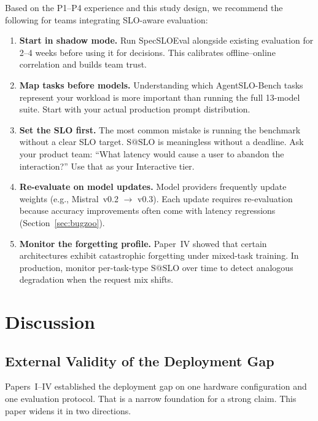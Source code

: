 \documentclass[11pt]{article}
\makeatletter
\newcommand{\sslo}{\ensuremath{\mathrm{S@SLO}}}
\makeatother
\begin{document}
Based on the P1--P4 experience and this study design, we recommend the following for teams integrating SLO-aware evaluation:

\begin{enumerate}[leftmargin=16pt]
    \item \textbf{Start in shadow mode.} Run SpecSLOEval alongside existing evaluation for 2--4 weeks before using it for decisions. This calibrates offline--online correlation and builds team trust.

    \item \textbf{Map tasks before models.} Understanding which AgentSLO-Bench tasks represent your workload is more important than running the full 13-model suite. Start with your actual production prompt distribution.

    \item \textbf{Set the SLO first.} The most common mistake is running the benchmark without a clear SLO target. $\sslo{}$ is meaningless without a deadline. Ask your product team: ``What latency would cause a user to abandon the interaction?'' Use that as your Interactive tier.

    \item \textbf{Re-evaluate on model updates.} Model providers frequently update weights (e.g., Mistral~v0.2 $\to$ v0.3). Each update requires re-evaluation because accuracy improvements often come with latency regressions (Section~\ref{sec:bugzoo}).

    \item \textbf{Monitor the forgetting profile.} Paper~IV showed that certain architectures exhibit catastrophic forgetting under mixed-task training. In production, monitor per-task-type $\sslo{}$ over time to detect analogous degradation when the request mix shifts.
\end{enumerate}

\section{Discussion}
\label{sec:discussion}

\subsection{External Validity of the Deployment Gap}

Papers~I--IV established the deployment gap on one hardware configuration and one evaluation protocol. That is a narrow foundation for a strong claim. This paper widens it in two directions.
\end{document}
